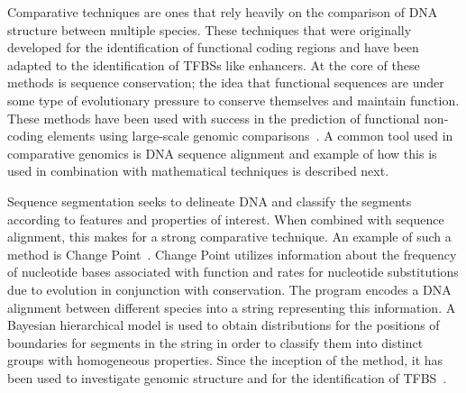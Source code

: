         Comparative techniques are ones that rely heavily on the comparison of DNA structure between multiple species.
        These techniques that were originally developed for the identification of functional coding regions and have been adapted to the identification of TFBSs like enhancers. At the core of these methods is sequence conservation; the idea that functional sequences are under some type of evolutionary pressure to conserve themselves and maintain function. These methods have been used with success in the prediction of functional non-coding elements using large-scale genomic comparisons~\cite{aparicio2002whole, gottgens2000analysis, loots2000identification, mouse2002initial}. A common tool used in comparative genomics is DNA sequence alignment and example of how this is used in combination with mathematical techniques is described next.

        
        Sequence segmentation seeks to delineate DNA and classify the segments according to features and properties of interest. When combined with sequence alignment, this makes for a strong comparative technique.
        An example of such a method is Change Point~\cite{keith2006segmenting}. Change Point utilizes information about the frequency of nucleotide bases associated with function and rates for nucleotide substitutions due to evolution in conjunction with conservation. The program encodes a DNA alignment between different species into a string representing this information. A Bayesian hierarchical model is used to obtain distributions for the positions of boundaries for segments in the string in order to classify them into distinct groups with homogeneous properties. Since the inception of the method, it has been used to investigate genomic structure and for the identification of TFBS~\cite{algama2014investigating, algama2017genome}. 
        
